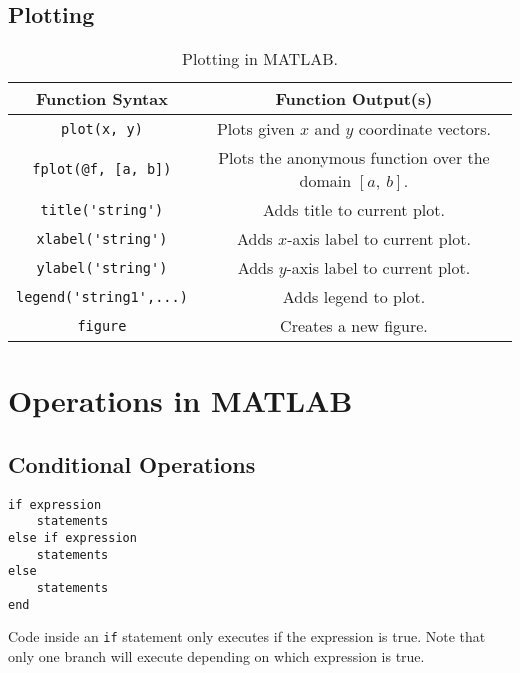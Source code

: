 \documentclass{article}
\begin{document}
\subsection{Plotting}
\begin{table}[H]
    \centering
    \begin{tabular}{c c}
        \toprule
        Function Syntax                   & Function Output(s)                                                      \\
        \midrule
        \lstinline!plot(x, y)!            & Plots given \(x\) and \(y\) coordinate vectors.                         \\
        \lstinline!fplot(@f, [a, b])!     & Plots the anonymous function over the domain \(\left[ a,\: b \right]\). \\
        \lstinline!title('string')!       & Adds title to current plot.                                             \\
        \lstinline!xlabel('string')!      & Adds \(x\)-axis label to current plot.                                  \\
        \lstinline!ylabel('string')!      & Adds \(y\)-axis label to current plot.                                  \\
        \lstinline!legend('string1',...)! & Adds legend to plot.                                                    \\ %
        \lstinline!figure!                & Creates a new figure.                                                   \\
        \bottomrule
    \end{tabular}
    \caption{Plotting in MATLAB.}
\end{table}
\section{Operations in MATLAB}
\subsection{Conditional Operations}
\begin{multicols}{2}
    \begin{lstlisting}
if expression
    statements
else if expression
    statements
else
    statements
end
    \end{lstlisting}
    \columnbreak
    Code inside an \lstinline{if} statement only executes if the expression is true. Note that only one branch will execute depending on which expression is true.
\end{multicols}
\end{document}
